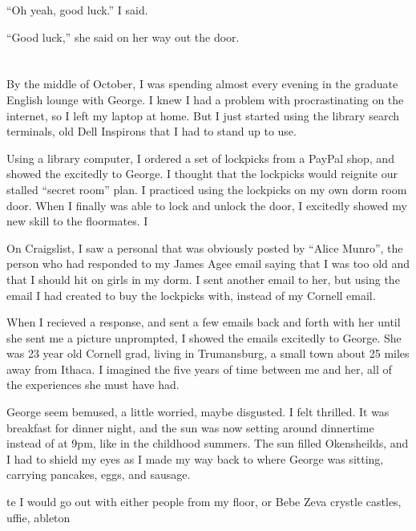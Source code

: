 ``Oh yeah, good luck.'' I said.

``Good luck,'' she said on her way out the door.


\section{}

By the middle of October, I was spending almost every evening in the graduate
English lounge with George.  I knew I had a problem with procrastinating on the
internet, so I left my laptop at home.  But I just started using the library
search terminals, old Dell Inspirons that I had to stand up to use.  

Using a library computer, I ordered a set of lockpicks from a PayPal shop, and
showed the excitedly to George.  I thought that the lockpicks would reignite our
stalled ``secret room'' plan.  I practiced using the lockpicks on my own dorm
room door.  When I finally was able to lock and unlock the door, I excitedly
showed my new skill to the floormates.  I 

On Craigslist, I saw a personal that was obviously posted by ``Alice Munro'',
the person who had responded to my James Agee email saying that I was too old
and that I should hit on girls in my dorm.  I sent another email to her, but
using the email I had created to buy the lockpicks with, instead of my Cornell
email.

When I recieved a response, and sent a few emails back and forth with her until
she sent me a picture unprompted, I showed the emails excitedly to George.  She
was 23 year old Cornell grad, living in Trumansburg, a small town about 25 miles
away from Ithaca.  I imagined the five years of time between me and her, all of
the experiences she must have had.

George seem bemused, a little worried, maybe disgusted.  I felt thrilled.  It
was breakfast for dinner night, and the sun was now setting around dinnertime
instead of at 9pm, like in the childhood summers.  The sun filled Okensheilds,
and I had to shield my eyes as I made my way back to where George was sitting,
carrying pancakes, eggs, and sausage. 

te I would go out with either people from my floor, or Bebe Zeva crystle
castles, uffie, ableton

\section{}

